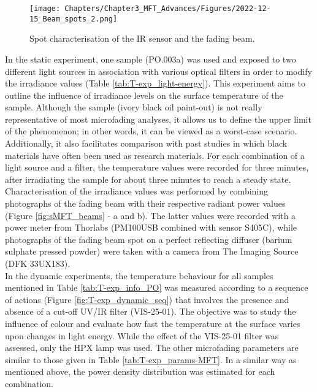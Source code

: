 \begin{figure*}[!h]
\centering
\texttt{[image: Chapters/Chapter3\_MFT\_Advances/Figures/2022-12-15\_Beam\_spots\_2.png]}
\caption[\hspace{0.3cm}Spot characterisation of the \gls{IR} sensor and the fading beam.]{Spot characterisation of the \gls{IR} sensor and the fading beam.}
\label{fig:T-exp_beam_spots}
\end{figure*}



In the static experiment, one sample (PO.003a) was used and exposed to two different light sources in association with various optical filters in order to modify the irradiance values (Table \ref{tab:T-exp_light-energy}). This experiment aims to outline the influence of irradiance levels on the surface temperature of the sample. Although the sample (ivory black oil paint-out) is not really representative of most microfading analyses, it allows us to define the upper limit of the phenomenon; in other words, it can be viewed as a worst-case scenario. Additionally, it also facilitates comparison with past studies in which black materials have often been used as research materials. For each combination of a light source and a filter, the temperature values were recorded for three minutes, after irradiating the sample for about three minutes to reach a steady state. Characterisation of the irradiance values was performed by combining photographs of the fading beam with their respective radiant power values (Figure \ref{fig:sMFT_beams} - a and b). The latter values were recorded with a power meter from Thorlabs (PM100USB combined with sensor S405C), while photographs of the fading beam spot on a perfect reflecting diffuser (barium sulphate pressed powder) were taken with a camera from The Imaging Source (DFK 33UX183).\\


In the dynamic experiments, the temperature behaviour for all samples mentioned in Table \ref{tab:T-exp_info_PO} was measured according to a sequence of actions (Figure \ref{fig:T-exp_dynamic_seq}) that involves the presence and absence of a cut-off \gls{UV}/\gls{IR} filter (VIS-25-01). The objective was to study the influence of colour and evaluate how fast the temperature at the surface varies upon changes in light energy. While the effect of the VIS-25-01 filter was assessed, only the \gls{HPX} lamp was used. The other microfading parameters are similar to those given in Table \ref{tab:T-exp_params-MFT}. In a similar way as mentioned above, the power density distribution was estimated for each combination.\\


